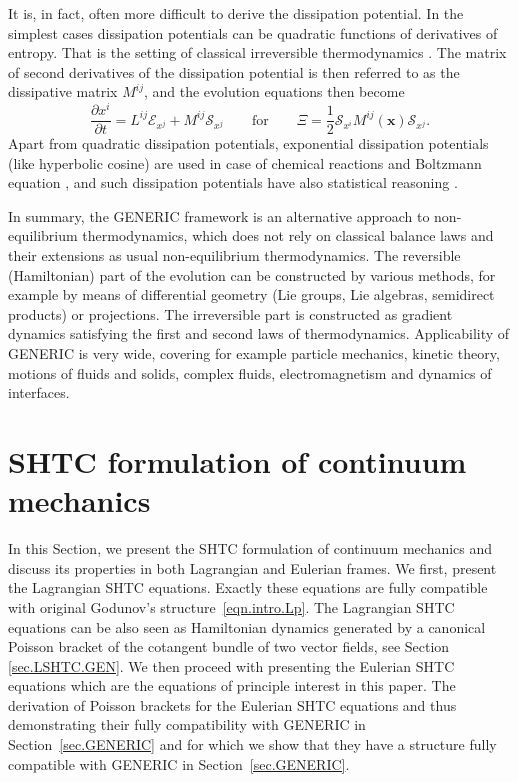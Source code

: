 \documentclass[twoside]{article}
\newcommand{\xx}{{\boldsymbol{x}}}
\newcommand{\SF}{\mathscr{S}}
\newcommand{\EF}{\mathscr{E}}
\newcommand{\pd}{\partial}
\begin{document}
It is, in fact, often more difficult to derive the dissipation potential. In 
the simplest cases dissipation potentials can be quadratic functions of 
derivatives of entropy. That is the setting of classical irreversible 
thermodynamics \cite{dGM}. The matrix of second derivatives of the dissipation 
potential is then referred to as the dissipative matrix $M^{ij}$, and the 
evolution equations then become
\begin{equation}
\frac{\pd x^i}{\pd t} = L^{ij}\EF_{x^j} + M^{ij} \SF_{x^j} \qquad \mbox{for} 
\qquad 
\Xi = \frac{1}{2} 
\SF_{x^i} M^{ij}(\xx) \SF_{x^j}.
\end{equation}
Apart from quadratic dissipation potentials, exponential dissipation potentials 
(like hyperbolic cosine) are used in case of chemical reactions and Boltzmann 
equation \cite{GrmelaOttingerI,Grmela2012-PhysD}, and such dissipation 
potentials have also statistical reasoning \cite{Mielke2014}.

In summary, the GENERIC framework is an alternative approach to non-equilibrium 
thermodynamics, which does not rely on classical balance laws and their 
extensions as usual non-equilibrium thermodynamics. The reversible 
(Hamiltonian) part of the evolution can be constructed by various methods, for 
example by means of differential geometry (Lie groups, Lie algebras, semidirect 
products) or projections. The irreversible part is constructed as gradient 
dynamics satisfying the first and second laws of thermodynamics. Applicability 
of GENERIC is very wide, covering for example particle mechanics, kinetic 
theory, motions of fluids and solids, complex fluids, electromagnetism and 
dynamics of interfaces.

\section{SHTC formulation of continuum mechanics}

In this Section, we present the SHTC formulation of continuum mechanics and 
discuss its properties in both Lagrangian and Eulerian frames. We 
first, present the Lagrangian SHTC equations. Exactly these 
equations are fully compatible with original Godunov's 
structure~\eqref{eqn.intro.Lp}. 
The Lagrangian SHTC equations can be also seen as Hamiltonian dynamics 
generated by a canonical Poisson bracket of the cotangent bundle of two vector 
fields, see Section \ref{sec.LSHTC.GEN}.
We then proceed with 
presenting the Eulerian SHTC 
equations which are the equations of principle interest in this paper. The 
derivation of Poisson brackets for the Eulerian SHTC equations and thus 
demonstrating their fully compatibility with GENERIC in 
Section~\ref{sec.GENERIC} and for which we show that 
they have a structure fully compatible with 
GENERIC in 
Section~\ref{sec.GENERIC}.
\end{document}
